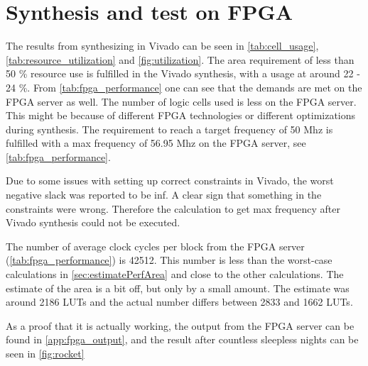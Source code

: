 \section{Synthesis and test on FPGA}
\label{sec:synthezisResults}
The results from synthesizing in Vivado can be seen in \cref{tab:cell_usage}, \cref{tab:resource_utilization} and \cref{fig:utilization}. The area requirement of less than 50 \% resource use is fulfilled in the Vivado synthesis, with a usage at around 22 - 24 \%. From \cref{tab:fpga_performance} one can see that the demands are met on the FPGA server as well. The number of logic cells used is less on the FPGA server. This might be because of different FPGA technologies or different optimizations during synthesis. The requirement to reach a target frequency of 50 Mhz is fulfilled with a max frequency of 56.95 Mhz on the FPGA server, see \cref{tab:fpga_performance}.

Due to some issues with setting up correct constraints in Vivado, the worst negative slack was reported to be inf. A clear sign that something in the constraints were wrong. Therefore the calculation to get max frequency after Vivado synthesis could not be executed.

The number of average clock cycles per block from the FPGA server (\cref{tab:fpga_performance}) is 42512. This number is less than the worst-case calculations in \cref{sec:estimatePerfArea} and close to the other calculations. The estimate of the area is a bit off, but only by a small amount. The estimate was around 2186 LUTs and the actual number differs between 2833 and 1662 LUTs.

As a proof that it is actually working, the output from the FPGA server can be found in \cref{app:fpga_output}, and the result after countless sleepless nights can be seen in \cref{fig:rocket}

